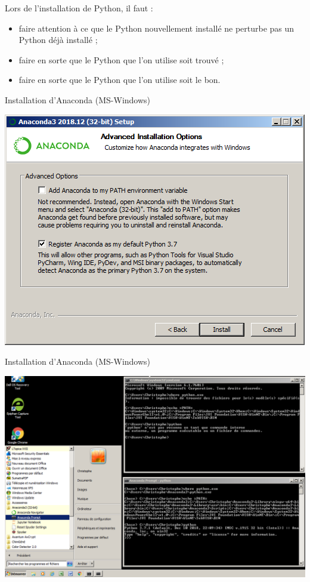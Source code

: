 \documentclass[10pt,aspectratio=169]{beamer}
\begin{document}
\begin{frame}
  \begin{Attention}
    Lors de l'installation de Python, il faut :
    \begin{itemize}
    \item faire attention à ce que le Python nouvellement installé \alert{ne perturbe pas} un Python déjà installé ;
    \item faire en sorte que le Python que l'on utilise soit \alert{trouvé} ;
    \item faire en sorte que le Python que l'on utilise soit \alert{le bon}.
    \end{itemize}
  \end{Attention}
\end{frame}

\begin{frame}{Installation d'Anaconda (MS-Windows)}
  \begin{center}
    \includegraphics[height = .8\textheight]{installation-anaconda-win-interaction-systeme}
  \end{center}
\end{frame}

\begin{frame}{Installation d'Anaconda (MS-Windows)}
  \begin{center}
    \includegraphics[height = .8\textheight]{anaconda-prompt-vs-cmd-windows.png}
  \end{center}
\end{frame}
\end{document}
